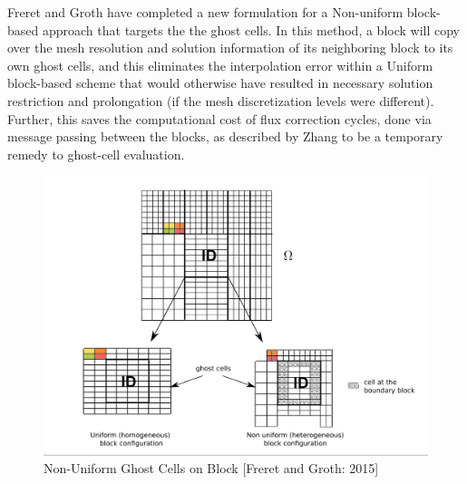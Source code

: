 \begin{enumerate}
Freret and Groth \cite{Freret:2015} have completed a new formulation for a Non-uniform block-based approach that targets the the ghost cells. In this method, a block will copy over the mesh resolution and solution information of its neighboring block to its own ghost cells, and this eliminates the interpolation error within a Uniform block-based scheme that would otherwise have resulted in necessary solution restriction and prolongation (if the mesh discretization levels were different). Further, this saves the computational cost of flux correction cycles, done via message passing between the blocks, as described by Zhang to be a temporary remedy to ghost-cell evaluation.\cite{zhang:2011b}

\begin{figure}
    \vspace{0.2cm}
    \begin{center}
      \includegraphics[height=0.35\textwidth]{./figs/Non-UniformBlock.png}
    \end{center}
    \caption{Non-Uniform Ghost Cells on Block [Freret and Groth: 2015] \cite{Freret:2015}}  
    \vspace{0.2cm}
\end{figure}

\end{enumerate}

